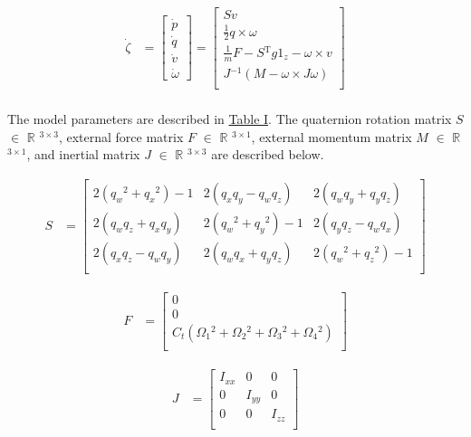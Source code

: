 \documentclass[conference]{IEEEtran}
\begin{document}
\begin{align*}
\dot{\zeta} &= \begin{bmatrix}
	\dot{p} \\
	\dot{q}\\
	\dot{v}\\
	\dot{\omega}
\end{bmatrix} =
\begin{bmatrix}
    Sv \\
    \frac{1}{2}q\times \omega\\
    \frac{1}{m}F - S\mathrm{^{T}}g1_z - \omega \times v\\ 
    J\mathrm{^{-1}}(M - \omega \times J \omega)\\
\end{bmatrix}\\
\end{align*}
 
The model parameters are described in \hyperref[table1]{Table I}. The quaternion rotation matrix $S$ $\in$ $\mathbb{R}$ $\mathrm{^{3\times3}}$, external force matrix $F$ $\in$ $\mathbb{R}$ $\mathrm{^{3\times1}}$, external momentum matrix $M$ $\in$ $\mathbb{R}$ $\mathrm{^{3\times1}}$, and inertial matrix $J$ $\in$ $\mathbb{R}$ $\mathrm{^{3\times3}}$ are described below.\\
\hfill\break

\begin{align*}
	S &=
	\begin{bmatrix}
		2(q_w \mathrm{^{2}} + q_x \mathrm{^{2}}) - 1 & 
		2(q_x q_y - q_w q_z) & 
		2(q_w q_y + q_y q_z) \\
		2(q_w q_z + q_x q_y) &
		2(q_w \mathrm{^{2}} + q_y \mathrm{^{2}}) - 1 & 
		2(q_y q_z - q_w q_x) \\
		2(q_x q_z - q_w q_y) & 
		2(q_w q_x + q_y q_z) & 
		2(q_w \mathrm{^{2}} + q_z \mathrm{^{2}}) - 1\\
	\end{bmatrix}
\end{align*}
\hfill\break

\begin{align*}
	F &=
	\begin{bmatrix}
		0 \\
		0 \\
		C_t(\Omega_1\mathrm{^{2}} + \Omega_2\mathrm{^{2}} + \Omega_3\mathrm{^{2}} + \Omega_4\mathrm{^{2}})\\ 
	\end{bmatrix}
\end{align*}
\hfill\break

\begin{align*}
	J &=   
	\begin{bmatrix}
		I_{xx} & 0 & 0\\
		0 & I_{yy} & 0\\
		0 & 0 & I_{zz}\\ 
	\end{bmatrix}
\end{align*}
\hfill\break
\end{document}
